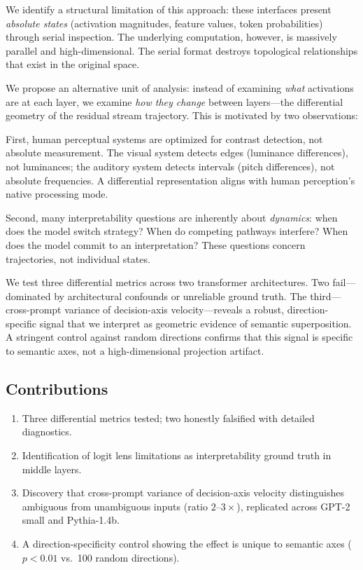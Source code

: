 \documentclass[11pt,a4paper]{article}
\begin{document}
We identify a structural limitation of this approach: these interfaces present \emph{absolute states} (activation magnitudes, feature values, token probabilities) through serial inspection. The underlying computation, however, is massively parallel and high-dimensional. The serial format destroys topological relationships that exist in the original space.

We propose an alternative unit of analysis: instead of examining \emph{what} activations are at each layer, we examine \emph{how they change} between layers---the differential geometry of the residual stream trajectory. This is motivated by two observations:

First, human perceptual systems are optimized for contrast detection, not absolute measurement. The visual system detects edges (luminance differences), not luminances; the auditory system detects intervals (pitch differences), not absolute frequencies. A differential representation aligns with human perception's native processing mode.

Second, many interpretability questions are inherently about \emph{dynamics}: when does the model switch strategy? When do competing pathways interfere? When does the model commit to an interpretation? These questions concern trajectories, not individual states.

We test three differential metrics across two transformer architectures. Two fail---dominated by architectural confounds or unreliable ground truth. The third---cross-prompt variance of decision-axis velocity---reveals a robust, direction-specific signal that we interpret as geometric evidence of semantic superposition. A stringent control against random directions confirms that this signal is specific to semantic axes, not a high-dimensional projection artifact.

\subsection{Contributions}
\begin{enumerate}
\item Three differential metrics tested; two honestly falsified with detailed diagnostics.
\item Identification of logit lens limitations as interpretability ground truth in middle layers.
\item Discovery that cross-prompt variance of decision-axis velocity distinguishes ambiguous from unambiguous inputs (ratio $2$--$3\times$), replicated across GPT-2 small and Pythia-1.4b.
\item A direction-specificity control showing the effect is unique to semantic axes ($p < 0.01$ vs.\ 100 random directions).
\end{enumerate}
\end{document}
